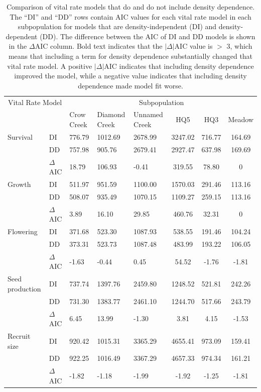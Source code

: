 \documentclass[12pt, letterpaper]{article}
\begin{document}
\begin{table}[h]
\centering
\begin{spacing}{1.2}
\caption{Comparison of vital rate models that do and do not include density dependence. The “DI” and “DD” rows contain AIC values for each vital rate model in each subpopulation for models that are density-independent (DI) and density-dependent (DD). The difference between the AIC of DI and DD models is shown in the $\Delta$AIC column. Bold text indicates that the $|\Delta|$AIC value is $>$ 3, which means that including a term for density dependence substantially changed that vital rate model. A positive $|\Delta|$AIC indicates that including density dependence improved the model, while a negative value indicates that including density dependence made model fit worse.\label{Table:DDModResults}}
\begin{tabular}{l l p{} p{} p{}ccc}
\toprule
\multicolumn{2}{c}{Vital Rate Model} & \multicolumn{6}{c}{Subpopulation} 
\\ \cline{3-8}
& & Crow Creek & Diamond Creek & Unnamed Creek & HQ5 & HQ3 & Meadow \\ 
\hline
\rowcolor[gray]{.95} Survival & DI & 776.79 & 1012.69 & 2678.99 & 3247.02 & 716.77 & 164.69 \\
\rowcolor[gray]{.95} & DD & 757.98 & 905.76 & 2679.41 & 2927.47 & 637.98 & 169.69 \\ 
\rowcolor[gray]{.95} & $\Delta$AIC & 18.79 & 106.93 & -0.41 & 319.55 & 78.80 & 0 \\ 
Growth & DI &  511.97 & 951.59 & 1100.00 & 1570.03 & 291.46 & 113.16 \\
& DD &  508.07 & 935.49 & 1070.15 & 1109.27 & 259.15 & 113.16 \\
& $\Delta$AIC & 3.89 & 16.10 & 29.85 & 460.76 & 32.31 & 0 \\
\rowcolor[gray]{.95} Flowering & DI & 371.68 & 523.30 & 1087.93 & 538.55 & 191.46 & 104.24 \\
\rowcolor[gray]{.95} & DD &  373.31 & 523.73  & 1087.48 & 483.99 & 193.22 & 106.05 \\
\rowcolor[gray]{.95} & $\Delta$AIC & -1.63 & -0.44 & 0.45 & 54.52 & -1.76 & -1.81 \\
Seed production & DI & 737.74 & 1397.76 & 2459.80 & 1248.52 & 521.81 & 242.26 \\
& DD & 731.30 & 1383.77 & 2461.10 & 1244.70 & 517.66 & 243.79 \\
 & $\Delta$AIC & 6.45 & 13.99 & -1.30 & 3.81 & 4.15 & -1.53 \\ 
\rowcolor[gray]{.95} Recruit size & DI & 920.42 & 1015.31 & 3365.29 & 4655.41 & 973.09 & 159.41 \\
\rowcolor[gray]{.95} & DD & 922.25 & 1016.49 & 3367.29 & 4657.33 & 974.34 & 161.21 \\ 
\rowcolor[gray]{.95} & $\Delta$AIC &  -1.82 & -1.18 & -1.99 & -1.92 & -1.25 & -1.81 \\
\hline
\end{tabular}
\end{spacing}
\end{table}
\end{document}
